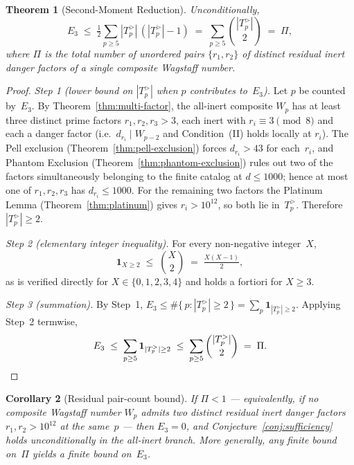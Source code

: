 \documentclass[12pt]{article}
\theoremstyle{plain}
\newtheorem{theorem}{Theorem}[section]
\newtheorem{corollary}[theorem]{Corollary}
\theoremstyle{definition}
\theoremstyle{remark}
\begin{document}
\begin{theorem}[Second-Moment Reduction]\label{thm:second-moment-reduction}
Unconditionally,
\[
  E_3 \;\leq\; \tfrac12 \sum_{p \geq 5} |T_p^{>}|\,(|T_p^{>}| - 1)
           \;=\; \sum_{p \geq 5} \binom{|T_p^{>}|}{2}
           \;=\; \Pi,
\]
where \(\Pi\) is the total number of unordered pairs
\(\{r_1, r_2\}\) of distinct residual inert danger factors of a
single composite Wagstaff number.
\end{theorem}

\begin{proof}
\emph{Step 1 (lower bound on \(|T_p^{>}|\) when \(p\) contributes to~\(E_3\)).}
Let \(p\) be counted by~\(E_3\). By
Theorem~\ref{thm:multi-factor}, the all-inert composite \(W_p\) has
at least three distinct prime factors \(r_1, r_2, r_3 > 3\), each
inert with \(r_i \equiv 3 \pmod 8\) and each a danger factor
(i.e.\ \(d_{r_i} \mid W_{p-2}\) and Condition~(II) holds locally
at \(r_i\)). The Pell exclusion
(Theorem~\ref{thm:pell-exclusion}) forces \(d_{r_i} > 43\) for
each~\(r_i\), and Phantom Exclusion
(Theorem~\ref{thm:phantom-exclusion}) rules out two of the factors
simultaneously belonging to the finite catalog at
\(d \leq 1000\); hence at most one of \(r_1, r_2, r_3\) has
\(d_{r_i} \leq 1000\). For the remaining two factors the Platinum
Lemma (Theorem~\ref{thm:platinum}) gives \(r_i > 10^{12}\), so
both lie in~\(T_p^{>}\). Therefore \(|T_p^{>}| \geq 2\).

\emph{Step 2 (elementary integer inequality).}
For every non-negative integer~\(X\),
\[
  \mathbf{1}_{X \geq 2} \;\leq\; \binom{X}{2} \;=\; \tfrac{X(X-1)}{2},
\]
as is verified directly for \(X \in \{0, 1, 2, 3, 4\}\) and holds a
fortiori for \(X \geq 3\).

\emph{Step 3 (summation).}
By Step~1, \(E_3 \leq \#\{\,p : |T_p^{>}| \geq 2\,\} = \sum_p
\mathbf{1}_{|T_p^{>}| \geq 2}\). Applying Step~2 termwise,
\[
  E_3 \;\leq\; \sum_{p \geq 5} \mathbf{1}_{|T_p^{>}| \geq 2}
     \;\leq\; \sum_{p \geq 5} \binom{|T_p^{>}|}{2}
     \;=\; \Pi. \qedhere
\]
\end{proof}

\begin{corollary}[Residual pair-count bound]\label{cor:residual-pair-count}
If \(\Pi < 1\) --- equivalently, if no composite Wagstaff number
\(W_p\) admits two distinct residual inert danger factors \(r_1,
r_2 > 10^{12}\) at the same~\(p\) --- then \(E_3 = 0\), and
Conjecture~\ref{conj:sufficiency} holds unconditionally in the
all-inert branch. More generally, any finite bound on~\(\Pi\)
yields a finite bound on~\(E_3\).
\end{corollary}
\end{document}
